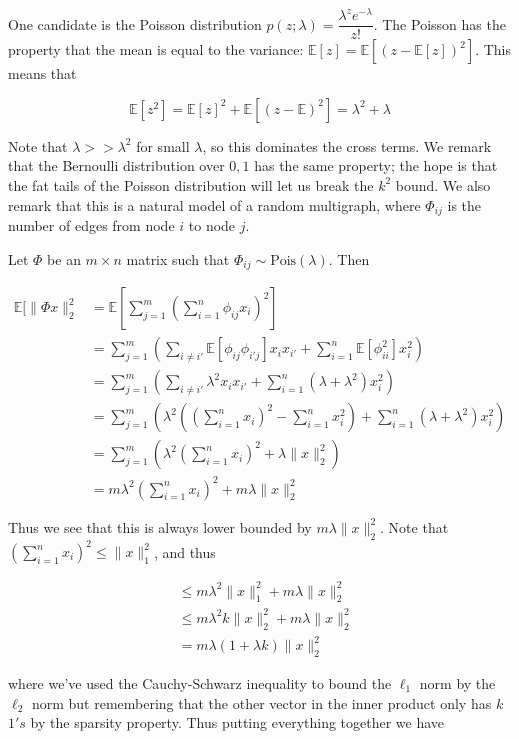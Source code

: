 \documentclass[english]{article}
\theoremstyle{plain}
\newcommand{\E}{\mathbb{E}}
\begin{document}
One candidate is the Poisson distribution $p(z; \lambda) = \dfrac{\lambda^z e^{-\lambda}}{z!}$. The Poisson has the property that the mean is equal to the variance: $\mathbb{E}[z] = \mathbb{E}[(z-\mathbb{E}[z])^2]$. This means that

\[\E[z^2] = \E[z]^2 + \E[(z-\E)^2] = \lambda^2 + \lambda\]

Note that $\lambda >> \lambda^2$ for small $\lambda$, so this dominates the cross terms. We remark that the Bernoulli distribution over $0,1$ has the same property; the hope is that the fat tails of the Poisson distribution will let us break the $k^2$ bound. We also remark that this is a natural model of a random multigraph, where $\Phi_{ij}$ is the number of edges from node $i$ to node $j$. 

Let $\Phi$ be an $m\times n$ matrix such that $\Phi_{ij} \sim \text{Pois}(\lambda)$. Then

\begin{align*}
	\E[\|\Phi x\|_2^2 &= \E\left[\sum_{j=1}^m \left( \sum_{i=1}^n \phi_{ij} x_i \right)^2\right]\\
	&= \sum_{j=1}^m \left(\sum_{i\neq i'} \E[\phi_{ij}\phi_{i'j}]x_ix_{i'} + \sum_{i=1}^n \E[\phi_{ii}^2] x_i^2 \right)\\
	&= \sum_{j=1}^m \left( \sum_{i\neq i'} \lambda^2 x_i x_{i'} + \sum_{i=1}^n (\lambda+\lambda^2) x_i^2 \right)\\
	&= \sum_{j=1}^m \left( \lambda^2 \left( \left(\sum_{i=1}^n x_i \right)^2 - \sum_{i=1}^n x_i^2 \right) + \sum_{i=1}^n (\lambda + \lambda^2)x_i^2 \right)\\
	&= \sum_{j=1}^m \left( \lambda^2 \left( \sum_{i=1}^n x_i \right)^2 + \lambda \|x\|_2^2 \right)\\
	&= m\lambda^2 \left(\sum_{i=1}^n x_i \right)^2 + m\lambda \|x\|_2^2
\end{align*}

Thus we see that this is always lower bounded by $m\lambda\|x\|_2^2$. Note that $\left(\displaystyle\sum_{i=1}^n x_i \right)^2 \le \|x\|_1^2$, and thus

\begin{align*}
	&\le m\lambda^2 \|x\|_1^2 + m\lambda\|x\|_2^2\\
	&\le m\lambda^2 k\|x\|_2^2 + m\lambda\|x\|_2^2\\
	&= m\lambda (1+\lambda k)\|x\|_2^2
\end{align*}

where we've used the Cauchy-Schwarz inequality to bound the $\ell_1$ norm by the $\ell_2$ norm but remembering that the other vector in the inner product only has $k$ $1's$ by the sparsity property. Thus putting everything together we have
\end{document}

